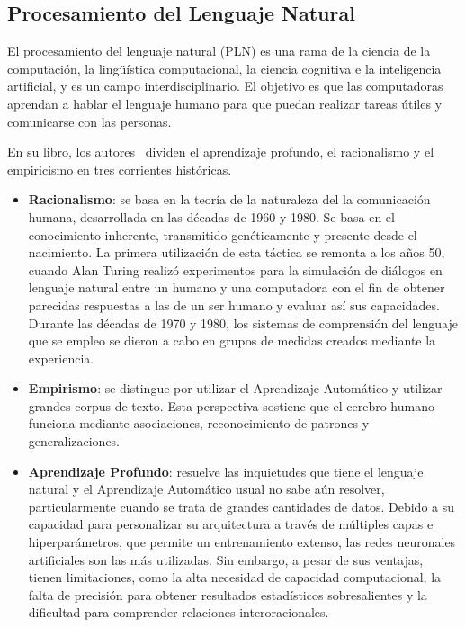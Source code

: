 \subsection{Procesamiento del Lenguaje Natural}
El procesamiento del lenguaje natural (PLN) es una rama de la ciencia de la computación, la lingüística computacional, la ciencia cognitiva e la inteligencia artificial, y es un campo interdisciplinario. El objetivo es que las computadoras aprendan a hablar el lenguaje humano para que puedan realizar tareas útiles y comunicarse con las personas. \parencite{bk_deng2018deeplearningnlp}

En su libro, los autores \citeauthor{bk_deng2018deeplearningnlp} dividen el aprendizaje profundo, el racionalismo y el empiricismo en tres corrientes históricas.

\begin{itemize}
	\item \textbf{Racionalismo}: se basa en la teoría de la naturaleza del la comunicación humana, desarrollada en las décadas de 1960 y 1980. Se basa en el conocimiento inherente, transmitido genéticamente y presente desde el nacimiento. La primera utilización de esta táctica se remonta a los años 50, cuando Alan Turing realizó experimentos para la simulación de diálogos en lenguaje natural entre un humano y una computadora con el fin de obtener parecidas respuestas a las de un ser humano y evaluar así sus capacidades. Durante las décadas de 1970 y 1980, los sistemas de comprensión del lenguaje que se empleo se dieron a cabo en grupos de medidas creados mediante la experiencia.
	
	\item \textbf{Empirismo}: se distingue por utilizar el Aprendizaje Automático y utilizar grandes corpus de texto. Esta perspectiva sostiene que el cerebro humano funciona mediante asociaciones, reconocimiento de patrones y generalizaciones. 
	
	\item \textbf{Aprendizaje Profundo}: resuelve las inquietudes que tiene el lenguaje natural y el Aprendizaje Automático usual no sabe aún resolver, particularmente cuando se trata de grandes cantidades de datos. Debido a su capacidad para personalizar su arquitectura a través de múltiples capas e hiperparámetros, que permite un entrenamiento extenso, las redes neuronales artificiales son las más utilizadas. Sin embargo, a pesar de sus ventajas, tienen limitaciones, como la alta necesidad de capacidad computacional, la falta de precisión para obtener resultados estadísticos sobresalientes y la dificultad para comprender relaciones interoracionales.
\end{itemize}

